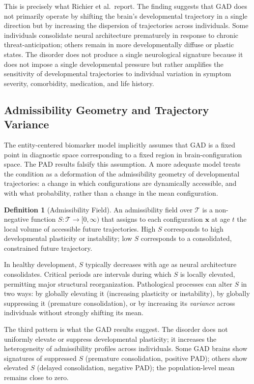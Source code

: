 \documentclass[11pt,a4paper]{article}
\theoremstyle{plain}
\theoremstyle{definition}
\newtheorem{definition}[theorem]{Definition}
\begin{document}
This is precisely what Richier et al.\ report. The finding suggests that GAD does not
primarily operate by shifting the brain's developmental trajectory in a single direction
but by increasing the dispersion of trajectories across individuals. Some individuals
consolidate neural architecture prematurely in response to chronic threat-anticipation;
others remain in more developmentally diffuse or plastic states. The disorder does not
produce a single neurological signature because it does not impose a single developmental
pressure but rather amplifies the sensitivity of developmental trajectories to individual
variation in symptom severity, comorbidity, medication, and life history.

\subsection{Admissibility Geometry and Trajectory Variance}

The entity-centered biomarker model implicitly assumes that GAD is a fixed point in
diagnostic space corresponding to a fixed region in brain-configuration space. The PAD
results falsify this assumption. A more adequate model treats the condition as a
deformation of the admissibility geometry of developmental trajectories: a change in
which configurations are dynamically accessible, and with what probability, rather than
a change in the mean configuration.

\begin{definition}[Admissibility Field]
An admissibility field over $\mathcal{T}$ is a non-negative function
$S: \mathcal{T} \to [0, \infty)$ that assigns to each configuration $\mathbf{x}$ at age
$t$ the local volume of accessible future trajectories. High $S$ corresponds to high
developmental plasticity or instability; low $S$ corresponds to a consolidated, constrained
future trajectory.
\end{definition}

In healthy development, $S$ typically decreases with age as neural architecture
consolidates. Critical periods are intervals during which $S$ is locally elevated,
permitting major structural reorganization. Pathological processes can alter $S$ in two
ways: by globally elevating it (increasing plasticity or instability), by globally
suppressing it (premature consolidation), or by increasing its \emph{variance} across
individuals without strongly shifting its mean.

The third pattern is what the GAD results suggest. The disorder does not uniformly
elevate or suppress developmental plasticity; it increases the heterogeneity of
admissibility profiles across individuals. Some GAD brains show signatures of suppressed
$S$ (premature consolidation, positive PAD); others show elevated $S$ (delayed
consolidation, negative PAD); the population-level mean remains close to zero.
\end{document}
